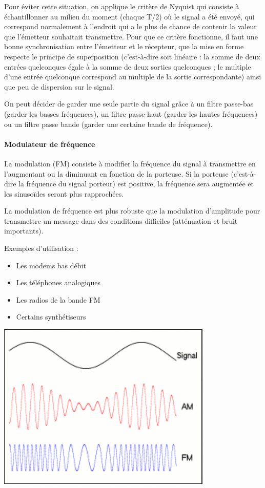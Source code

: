 Pour éviter cette situation, on applique le critère de Nyquist qui consiste à échantillonner au milieu du moment (chaque T/2) où le signal a été envoyé, qui correspond normalement à l'endroit qui a le plus de chance de contenir la valeur que l'émetteur souhaitait transmettre. Pour que ce critère fonctionne, il faut une bonne synchronisation entre l'émetteur et le récepteur, que la mise en forme respecte le principe de superposition (c'est-à-dire soit linéaire : la somme de deux entrées quelconques égale à la somme de deux sorties quelconques ; le multiple d'une entrée quelconque correspond au multiple de la sortie correspondante) ainsi que peu de dispersion sur le signal.

On peut décider de garder une seule partie du signal grâce à un filtre passe-bas (garder les basses fréquences), un filtre passe-haut (garder les hautes fréquences) ou un filtre passe bande (garder une certaine bande de fréquence).

\paragraph{Modulateur de fréquence}

La modulation (FM) consiste à modifier la fréquence du signal à transmettre en l'augmentant ou la diminuant en fonction de la porteuse.  Si la porteuse (c'est-à-dire la fréquence du signal porteur) est positive, la fréquence sera augmentée et les sinusoïdes seront plus rapprochées.

La modulation de fréquence est plus robuste que la modulation d'amplitude pour transmettre un message dans des conditions difficiles (atténuation et bruit importants).  

Exemples d'utilisation :
\begin{itemize}
    \item Les modems bas débit
    \item Les téléphones analogiques
    \item Les radios de la bande FM
    \item Certains synthétiseurs
\end{itemize}

\begin{center}
    \includegraphics[width=0.5\linewidth]{img/modulation_am_fm.png}
\end{center}


